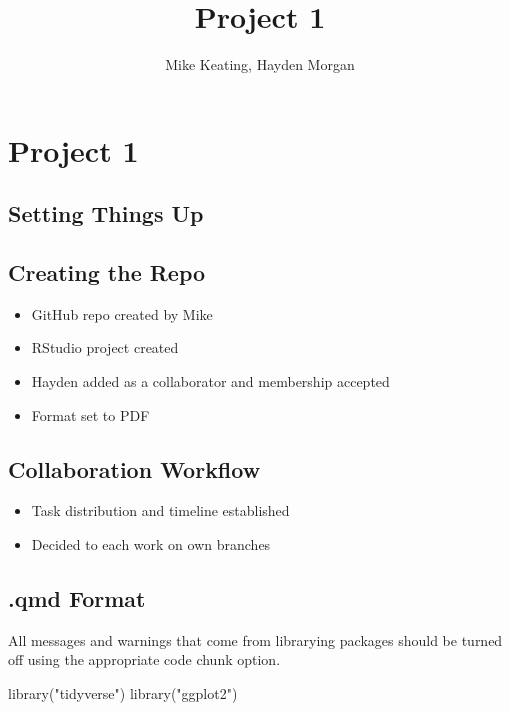 \documentclass[
  letterpaper,
  DIV=11,
  numbers=noendperiod]{scrartcl}
\title{Project 1}
\author{Mike Keating, Hayden Morgan}
\date{}
\newenvironment{Shaded}{\begin{snugshade}}{\end{snugshade}}
\newcommand{\FunctionTok}[1]{\textcolor[rgb]{0.28,0.35,0.67}{#1}}
\newcommand{\NormalTok}[1]{\textcolor[rgb]{0.00,0.23,0.31}{#1}}
\newcommand{\StringTok}[1]{\textcolor[rgb]{0.13,0.47,0.30}{#1}}
\begin{document}
\maketitle


\section{Project 1}\label{project-1}

\subsection{Setting Things Up}\label{setting-things-up}

\subsection{Creating the Repo}\label{creating-the-repo}

\begin{itemize}
\item
  GitHub repo created by Mike
\item
  RStudio project created
\item
  Hayden added as a collaborator and membership accepted
\item
  Format set to PDF
\end{itemize}

\subsection{Collaboration Workflow}\label{collaboration-workflow}

\begin{itemize}
\item
  Task distribution and timeline established
\item
  Decided to each work on own branches
\end{itemize}

\subsection{.qmd Format}\label{qmd-format}

All messages and warnings that come from librarying packages should be
turned off using the appropriate code chunk option.

\begin{Shaded}
\begin{Highlighting}[]
\FunctionTok{library}\NormalTok{(}\StringTok{"tidyverse"}\NormalTok{)}
\FunctionTok{library}\NormalTok{(}\StringTok{"ggplot2"}\NormalTok{)}
\end{Highlighting}
\end{Shaded}
\end{document}
